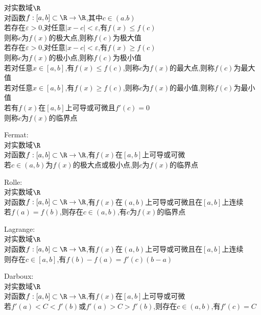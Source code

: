 \begin{dingyi}
对实数域$\R$\\
对函数$f:[a,b]\subset \R \to \R$,其中$c\in(a.b)$\\
若存在$\varepsilon>0$,对任意$|x-c|<\varepsilon$,有$f(x)\leq f(c)$\\
则称$c$为$f(x)$的极大点,则称$f(c)$为极大值\\
若存在$\varepsilon>0$,对任意$|x-c|<\varepsilon$,有$f(x)\geq f(c)$\\
则称$c$为$f(x)$的极小点,则称$f(c)$为极小值\\
若对任意$x\in[a,b]$,有$f(x)\leq f(c)$,则称$c$为$f(x)$的最大点,则称$f(c)$为最大值\\
若对任意$x\in[a,b]$,有$f(x)\geq f(c)$,则称$c$为$f(x)$的最小值,则称$f(c)$为最小值\\
若有$f(x)$在$[a,b]$上可导或可微且$f'(c)=0$\\
则称$c$为$f(x)$的临界点
\end{dingyi}

\begin{dingli}
Fermat:\\
对实数域$\R$\\
对函数$f:[a,b]\subset \R \to \R$,有$f(x)$在$[a,b]$上可导或可微\\
若$c\in (a,b)$为$f(x)$的极大点或极小点,则$c$为$f(x)$的临界点
\end{dingli}

\begin{dingli}
Rolle:\\
对实数域$\R$\\
对函数$f:[a,b]\subset \R \to \R$,有$f(x)$在$(a,b)$上可导或可微且在$[a,b]$上连续\\
若$f(a)=f(b)$,则存在$c\in (a,b)$,有$c$为$f(x)$的临界点
\end{dingli}

\begin{dingli}
Lagrange:\\
对实数域$\R$\\
对函数$f:[a,b]\subset \R \to \R$,有$f(x)$在$(a,b)$上可导或可微且在$[a,b]$上连续\\
则存在$c\in [a,b]$,有$f(b)-f(a)=f'(c)(b-a)$
\end{dingli}

\begin{dingli}
Darboux:\\
对实数域$\R$\\
对函数$f:[a,b]\subset \R \to \R$,有$f(x)$在$[a,b]$上可导或可微\\
若$f'(a)<C<f'(b)$或$f'(a)>C>f'(b)$,则存在$c\in (a,b)$,有$f'(c)=C$
\end{dingli}


